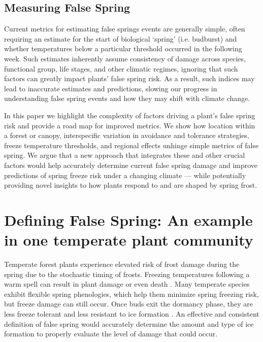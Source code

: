 \documentclass{article}\usepackage[]{graphicx}\usepackage[]{color}
\begin{document}
\subsection*{Measuring False Spring}
Current metrics for estimating false springs events are generally simple, often requiring an estimate for the start of biological `spring' (i.e. budburst) and whether temperatures below a particular threshold occurred in the following week. Such estimates inherently assume consistency of damage across species, functional group, life stages, and other climatic regimes, ignoring that such factors can greatly impact plants' false spring risk. As a result, such indices may lead to inaccurate estimates and predictions, slowing our progress in understanding false spring events and how they may shift with climate change. 

In this paper we highlight the complexity of factors driving a plant's false spring risk and provide a road map for improved metrics. We show how location within a forest or canopy, interspecific variation in avoidance and tolerance strategies, freeze temperature thresholds, and regional effects unhinge simple metrics of false spring. We argue that a new approach that integrates these and other crucial factors would help accurately determine current false spring damage and improve predictions of spring freeze risk under a changing climate --- while potentially providing novel insights to how plants respond to and are shaped by spring frost. %

\section*{Defining False Spring: An example in one temperate plant community}
Temperate forest plants experience elevated risk of frost damage during the spring due to the stochastic timing of frosts. Freezing temperatures following a warm spell can result in plant damage or even death \citep{Ludlum1968, Mock2007}. Many temperate species exhibit flexible spring phenologies, which help them minimize spring freezing risk, but freeze damage can still occur. Once buds exit the dormancy phase, they are less freeze tolerant and less resistant to ice formation \citep{Taschler2004, Lenz2013, Vitasse2014a}. %
An effective and consistent definition of false spring would accurately determine the amount and type of ice formation to properly evaluate the level of damage that could occur.
 
\end{document}

